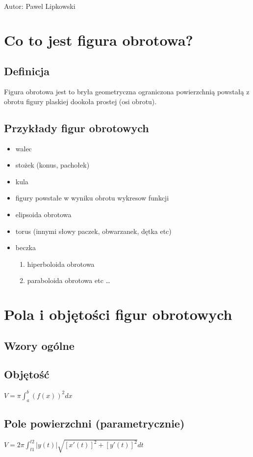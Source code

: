 \documentclass{article}
\begin{document}
Autor: Pawel Lipkowski\newline
\newline
\section{Co to jest figura obrotowa?}
	\subsection{Definicja}
		 Figura obrotowa jest to bryła geometryczna ograniczona powierzchnią powstałą z obrotu figury plaskiej dookoła prostej (osi obrotu).~\cite{def}
	\subsection{Przykłady figur obrotowych}
		\begin{itemize}
 			\item walec
 			\item stożek (konus, pachołek)
 			\item kula
			\item figury powstałe w wyniku obrotu wykresow funkcji
			\item elipsoida obrotowa
			\item torus (innymi słowy paczek, obwarzanek, dętka etc)
			\item beczka
			\begin{enumerate}
  				\item hiperboloida obrotowa
  				\item paraboloida obrotowa etc \ldots
			\end{enumerate}
		\end{itemize}
\section{Pola i objętości figur obrotowych}
	\subsection{Wzory ogólne}
		\subsection{Objętość}
			$V = \pi \int_{a}^{b}(f(x))^{2}dx $	
		\subsection{Pole powierzchni (parametrycznie)}
			$V = 2 \pi \int_{t1}^{t2} |y(t)| \sqrt{[x'(t)]^2 + [y'(t)]^2} dt $
\end{document}

